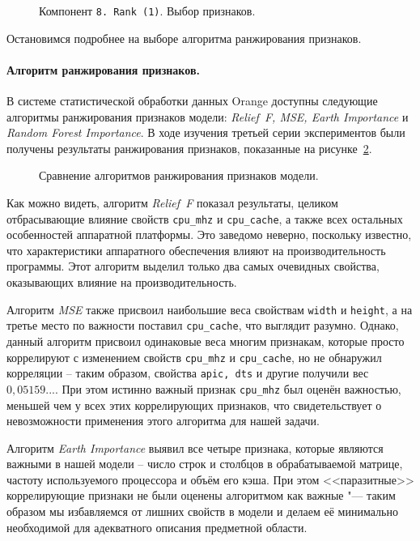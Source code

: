 \begin{figure}[H]
    \caption{Компонент \texttt{8.\,Rank~(1)}. Выбор признаков.}
    \label{img:8-Rank-1}
\end{figure}

Остановимся подробнее на выборе алгоритма ранжирования признаков.

\paragraph{Алгоритм ранжирования признаков.}
\label{choice-of-feature-ranking-algorithm}

В системе статистической обработки данных Orange доступны следующие алгоритмы ранжирования признаков модели: \textit{Relief~F, MSE, Earth Importance} и \textit{Random Forest Importance}. В ходе изучения третьей серии экспериментов были получены результаты ранжирования признаков, показанные на рисунке~\ref{img:ranking-full}.

\begin{figure}[H]
    \caption{Сравнение алгоритмов ранжирования признаков модели.}
    \label{img:ranking-full}
\end{figure}

Как можно видеть, алгоритм \textit{Relief~F} показал результаты, целиком отбрасывающие влияние свойств \texttt{cpu_mhz} и \texttt{cpu_cache}, а также всех остальных особенностей аппаратной платформы. Это заведомо неверно, поскольку известно, что характеристики аппаратного обеспечения влияют на производительность программы. Этот алгоритм выделил только два самых очевидных свойства, оказывающих влияние на производительность.

Алгоритм \textit{MSE} также присвоил наибольшие веса свойствам \texttt{width} и \texttt{height}, а на третье место по важности поставил \texttt{cpu_cache}, что выглядит разумно. Однако, данный алгоритм присвоил одинаковые веса многим признакам, которые просто коррелируют с изменением свойств \texttt{cpu_mhz} и \texttt{cpu_cache}, но не обнаружил корреляции -- таким образом, свойства \texttt{apic, dts} и другие получили вес $0,05159...$. При этом истинно важный признак \texttt{cpu_mhz} был оценён важностью, меньшей чем у всех этих коррелирующих признаков, что свидетельствует о невозможности применения этого алгоритма для нашей задачи.

Алгоритм \textit{Earth Importance} выявил все четыре признака, которые являются важными в нашей модели -- число строк и столбцов в обрабатываемой матрице, частоту используемого процессора и объём его кэша. При этом <<паразитные>> коррелирующие признаки не были оценены алгоритмом как важные "--- таким образом мы избавляемся от лишних свойств в модели и делаем её минимально необходимой для адекватного описания предметной области.

